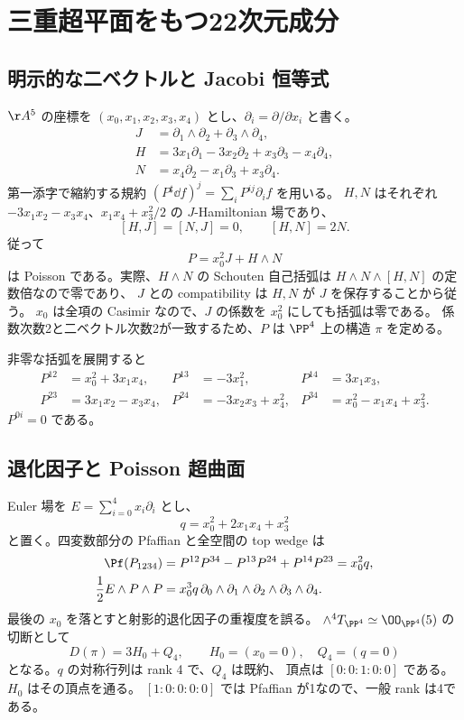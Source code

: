 \section{三重超平面をもつ22次元成分}\label{sec:new}
\subsection{明示的な二ベクトルと Jacobi 恒等式}
$\AA^5$ の座標を $(x_0,x_1,x_2,x_3,x_4)$ とし、$\partial_i=\partial/\partial x_i$ と書く。
\begin{align*}
 J&=\partial_1\wedge\partial_2+\partial_3\wedge\partial_4,\\
 H&=3x_1\partial_1-3x_2\partial_2+x_3\partial_3-x_4\partial_4,\\
 N&=x_4\partial_2-x_1\partial_3+x_3\partial_4.
\end{align*}
第一添字で縮約する規約
$(P^\sharp\dd f)^j=\sum_iP^{ij}\partial_i f$ を用いる。
$H,N$ はそれぞれ $-3x_1x_2-x_3x_4$、$x_1x_4+x_3^2/2$ の $J$-Hamiltonian 場であり、
\[
                 [H,J]=[N,J]=0,\qquad [H,N]=2N.
\]
従って
\begin{equation}\label{eq:newP}
                            P=x_0^2J+H\wedge N
\end{equation}
は Poisson である。実際、$H\wedge N$ の Schouten 自己括弧は
$H\wedge N\wedge[H,N]$ の定数倍なので零であり、
$J$ との compatibility は $H,N$ が $J$ を保存することから従う。
$x_0$ は全項の Casimir なので、$J$ の係数を $x_0^2$ にしても括弧は零である。
係数次数2と二ベクトル次数2が一致するため、$P$ は $\PP^4$ 上の構造 $\pi$ を定める。

非零な括弧を展開すると
\begin{equation}\label{eq:brackets}
\begin{aligned}
 P^{12}&=x_0^2+3x_1x_4,& P^{13}&=-3x_1^2,&P^{14}&=3x_1x_3,\\
 P^{23}&=3x_1x_2-x_3x_4,&P^{24}&=-3x_2x_3+x_4^2,&
 P^{34}&=x_0^2-x_1x_4+x_3^2.
\end{aligned}
\end{equation}
$P^{0i}=0$ である。

\subsection{退化因子と Poisson 超曲面}
Euler 場を $E=\sum_{i=0}^4x_i\partial_i$ とし、
\[
                    q=x_0^2+2x_1x_4+x_3^2
\]
と置く。四変数部分の Pfaffian と全空間の top wedge は
\begin{align}
 \Pf(P_{1234})&=P^{12}P^{34}-P^{13}P^{24}+P^{14}P^{23}=x_0^2q,\label{eq:pf}\\
 \frac12E\wedge P\wedge P&=x_0^3q\,
 \partial_0\wedge\partial_1\wedge\partial_2\wedge\partial_3\wedge\partial_4.
 \label{eq:quintic}
\end{align}
最後の $x_0$ を落とすと射影的退化因子の重複度を誤る。
$\wedge^4T_{\PP^4}\simeq\OO_{\PP^4}(5)$ の切断として
\[
                D(\pi)=3H_0+Q_4,\qquad
 H_0=(x_0=0),\quad Q_4=(q=0)
\]
となる。$q$ の対称行列は rank 4 で、$Q_4$ は既約、
頂点は $[0:0:1:0:0]$ である。$H_0$ はその頂点を通る。
$[1:0:0:0:0]$ では Pfaffian が1なので、一般 rank は4である。

